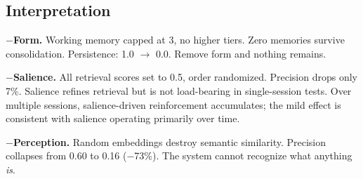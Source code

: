 \documentclass[10pt,twocolumn,a4paper]{article}
\begin{document}
\begin{table}[t]
\centering
\caption{Ablation results: each component removed independently. Persistence = fraction of memories surviving consolidation. Retrieval precision = fraction of top-5 results relevant to query. Self-model = whether first-person narrative is generated. Ego boundary = self/other distinction score (0--1).}
\label{tab:ablation}
\end{table}

\subsection{Interpretation}

\textbf{$-$Form.} Working memory capped at 3, no higher tiers. Zero memories survive consolidation. Persistence: 1.0 $\to$ 0.0. Remove form and nothing remains.

\textbf{$-$Salience.} All retrieval scores set to 0.5, order randomized. Precision drops only 7\%. Salience refines retrieval but is not load-bearing in single-session tests. Over multiple sessions, salience-driven reinforcement accumulates; the mild effect is consistent with salience operating primarily over time.

\textbf{$-$Perception.} Random embeddings destroy semantic similarity. Precision collapses from 0.60 to 0.16 ($-$73\%). The system cannot recognize what anything \emph{is}.
\end{document}
